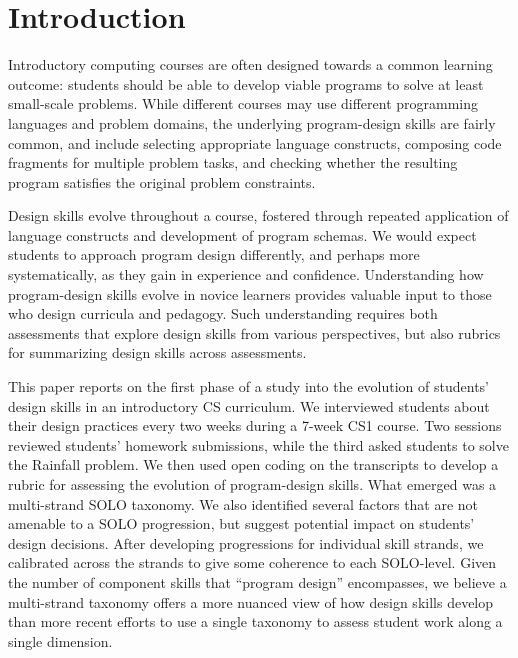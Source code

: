 \section{Introduction}

Introductory computing courses are often designed towards a common
learning outcome: students should be able to develop viable programs
to solve at least small-scale problems. While different
courses may use different programming languages and problem domains,
the underlying program-design skills are fairly common, and include
selecting appropriate language constructs, composing code fragments
for multiple problem tasks, and checking whether the resulting program
satisfies the original problem constraints.

Design skills evolve throughout a course, fostered through repeated
application of language constructs and development of program
schemas. We would expect students to approach program design
differently, and perhaps more systematically, as they gain in
experience and confidence.  Understanding how program-design skills
evolve in novice learners provides valuable input to those who design
curricula and pedagogy.  Such understanding requires both assessments
that explore design skills from various perspectives, but also rubrics
for summarizing design skills across assessments.

This paper reports on the first phase of a study into the evolution of
students' design skills in an introductory CS curriculum. We
interviewed students about their design practices every two weeks
during a 7-week CS1 course.  Two sessions reviewed students' homework
submissions, while the third asked students to solve the Rainfall
problem. We then used open coding on the transcripts to develop a
rubric for assessing the evolution of program-design skills.  What
emerged was a multi-strand SOLO taxonomy. We also identified several factors that are not amenable to a SOLO progression, but suggest potential impact on students' design decisions.  After developing
progressions for individual skill strands, we calibrated across
the strands to give some coherence to each SOLO-level.  Given the
number of component skills that ``program design'' encompasses, we
believe a multi-strand taxonomy offers a more nuanced view of how
design skills develop than more recent efforts to use a single
taxonomy to assess student work along a single dimension.

